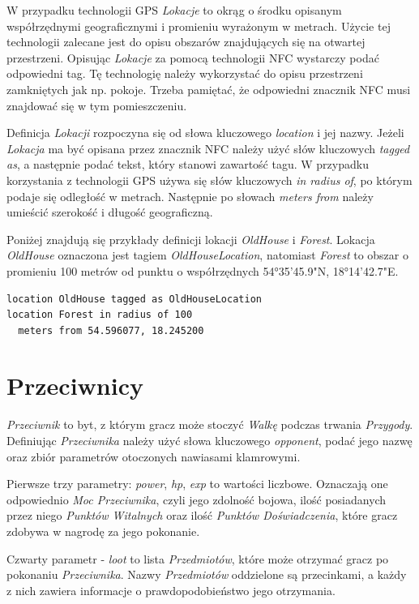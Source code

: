 \documentclass[openright]{xmgr}
\begin{document}
W przypadku technologii GPS \textit{Lokacje} to okrąg o środku opisanym współrzędnymi geograficznymi i promieniu wyrażonym w metrach. Użycie tej technologii zalecane jest do opisu obszarów znajdujących się na otwartej przestrzeni.
Opisując \textit{Lokacje} za pomocą technologii NFC wystarczy podać odpowiedni tag. Tę technologię należy wykorzystać do opisu przestrzeni zamkniętych jak np. pokoje. Trzeba pamiętać, że odpowiedni znacznik NFC musi znajdować się w tym pomieszczeniu.

Definicja \textit{Lokacji} rozpoczyna się od słowa kluczowego \textit{location} i jej nazwy. Jeżeli \textit{Lokacja} ma być opisana przez znacznik NFC należy użyć słów kluczowych \textit{tagged as}, a następnie podać tekst, który stanowi zawartość tagu. W przypadku korzystania z technologii GPS używa się słów kluczowych \textit{in radius of}, po którym podaje się odległość w metrach. Następnie po słowach \textit{meters from} należy umieścić szerokość i długość geograficzną.

Poniżej znajdują się przykłady definicji lokacji \textit{OldHouse} i \textit{Forest}. Lokacja \textit{OldHouse} oznaczona jest tagiem \textit{OldHouseLocation}, natomiast \textit{Forest} to obszar o promieniu 100 metrów od punktu o współrzędnych 54°35'45.9"N, 18°14'42.7"E.
\begin{verbatim}
location OldHouse tagged as OldHouseLocation
location Forest in radius of 100 
  meters from 54.596077, 18.245200
\end{verbatim}

\section{Przeciwnicy}

\textit{Przeciwnik} to byt, z którym gracz może stoczyć \textit{Walkę} podczas trwania \textit{Przygody}. Definiując \textit{Przeciwnika} należy użyć słowa kluczowego \textit{opponent}, podać jego nazwę oraz zbiór parametrów otoczonych nawiasami klamrowymi.

Pierwsze trzy parametry: \textit{power}, \textit{hp}, \textit{exp} to wartości liczbowe. Oznaczają one odpowiednio \textit{Moc Przeciwnika}, czyli jego zdolność bojowa, ilość posiadanych przez niego \textit{Punktów Witalnych} oraz ilość \textit{Punktów Doświadczenia}, które gracz zdobywa w nagrodę za jego pokonanie.

Czwarty parametr - \textit{loot} to lista \textit{Przedmiotów}, które może otrzymać gracz po pokonaniu \textit{Przeciwnika}. Nazwy \textit{Przedmiotów} oddzielone są przecinkami, a każdy z nich zawiera informacje o prawdopodobieństwo jego otrzymania.
\end{document}
